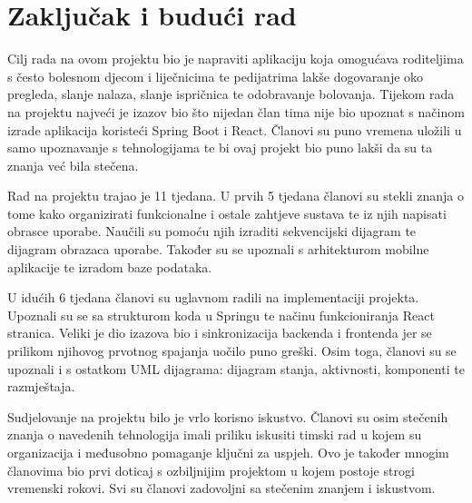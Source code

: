 \chapter{Zaključak i budući rad}
		
		 
		 Cilj rada na ovom projektu bio je napraviti aplikaciju koja omogućava roditeljima s često bolesnom djecom i liječnicima te pedijatrima lakše dogovaranje oko pregleda, slanje nalaza, slanje ispričnica te odobravanje bolovanja. Tijekom rada na projektu najveći je izazov bio što nijedan član tima nije bio upoznat s načinom izrade aplikacija koristeći Spring Boot i React. Članovi su puno vremena uložili u samo upoznavanje s tehnologijama te bi ovaj projekt bio puno lakši da su ta znanja već bila stečena. 
		 
		 Rad na projektu trajao je 11 tjedana. U prvih 5 tjedana članovi su stekli znanja o tome kako organizirati funkcionalne i ostale zahtjeve sustava te iz njih napisati obrasce uporabe. Naučili su pomoću njih izraditi sekvencijski dijagram te dijagram obrazaca uporabe. Također su se upoznali s arhitekturom mobilne aplikacije te izradom baze podataka.
		 
		 U idućih 6 tjedana članovi su uglavnom radili na implementaciji projekta. Upoznali su se sa strukturom koda u Springu te načinu funkcioniranja React stranica. Veliki je dio izazova bio i sinkronizacija backenda i frontenda jer se prilikom njihovog prvotnog spajanja uočilo puno greški. Osim toga, članovi su se upoznali i s ostatkom UML dijagrama: dijagram stanja, aktivnosti, komponenti te razmještaja.
		 
		 Sudjelovanje na projektu bilo je vrlo korisno iskustvo. Članovi su osim stečenih znanja o navedenih tehnologija imali priliku iskusiti timski rad u kojem su organizacija i međusobno pomaganje ključni za uspjeh. Ovo je također mnogim članovima bio prvi doticaj s ozbiljnijim projektom u kojem postoje strogi vremenski rokovi. Svi su članovi zadovoljni sa stečenim znanjem i iskustvom.
		
		\eject 